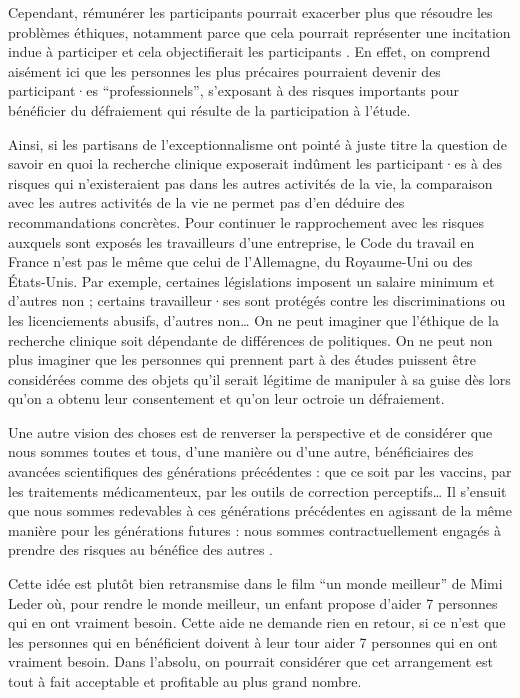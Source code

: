 \documentclass[
  12pt,
]{book}
\begin{document}
Cependant, rémunérer les participants pourrait exacerber plus que résoudre les problèmes éthiques, notamment parce que cela pourrait représenter une incitation indue à participer et cela objectifierait les participants \citep{sep-clinical-research}. En effet, on comprend aisément ici que les personnes les plus précaires pourraient devenir des participant·es ``professionnels'', s'exposant à des risques importants pour bénéficier du défraiement qui résulte de la participation à l'étude.

Ainsi, si les partisans de l'exceptionnalisme ont pointé à juste titre la question de savoir en quoi la recherche clinique exposerait indûment les participant·es à des risques qui n'existeraient pas dans les autres activités de la vie, la comparaison avec les autres activités de la vie ne permet pas d'en déduire des recommandations concrètes. Pour continuer le rapprochement avec les risques auxquels sont exposés les travailleurs d'une entreprise, le Code du travail en France n'est pas le même que celui de l'Allemagne, du Royaume-Uni ou des États-Unis. Par exemple, certaines législations imposent un salaire minimum et d'autres non ; certains travailleur·ses sont protégés contre les discriminations ou les licenciements abusifs, d'autres non\ldots{} On ne peut imaginer que l'éthique de la recherche clinique soit dépendante de différences de politiques. On ne peut non plus imaginer que les personnes qui prennent part à des études puissent être considérées comme des objets qu'il serait légitime de manipuler à sa guise dès lors qu'on a obtenu leur consentement et qu'on leur octroie un défraiement.

Une autre vision des choses est de renverser la perspective et de considérer que nous sommes toutes et tous, d'une manière ou d'une autre, bénéficiaires des avancées scientifiques des générations précédentes : que ce soit par les vaccins, par les traitements médicamenteux, par les outils de correction perceptifs\ldots{} Il s'ensuit que nous sommes redevables à ces générations précédentes en agissant de la même manière pour les générations futures : nous sommes contractuellement engagés à prendre des risques au bénéfice des autres \citep{Heyd1996, Harris2005}.

Cette idée est plutôt bien retransmise dans le film ``un monde meilleur'' de Mimi Leder où, pour rendre le monde meilleur, un enfant propose d'aider 7 personnes qui en ont vraiment besoin. Cette aide ne demande rien en retour, si ce n'est que les personnes qui en bénéficient doivent à leur tour aider 7 personnes qui en ont vraiment besoin. Dans l'absolu, on pourrait considérer que cet arrangement est tout à fait acceptable et profitable au plus grand nombre.
\end{document}
